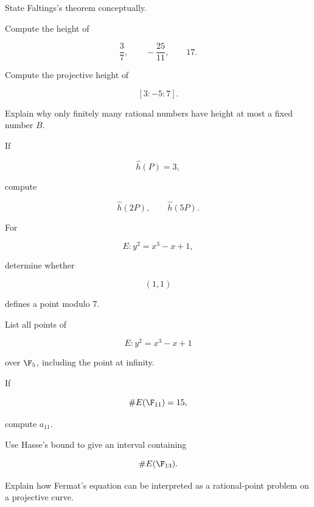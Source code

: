 \begin{exercise}[2]
State Faltings's theorem conceptually.
\end{exercise}

\begin{exercise}[1]
Compute the height of

\[
\frac37,\qquad
-\frac{25}{11},\qquad
17.
\]
\end{exercise}

\begin{exercise}[2]
Compute the projective height of

\[ [3:-5:7]. \]
\end{exercise}

\begin{exercise}[2]
Explain why only finitely many rational numbers have height at most a fixed
number \(B\).
\end{exercise}

\begin{exercise}[2]
If

\[ \hat h(P)=3, \]

compute

\[ \hat h(2P),\qquad\hat h(5P). \]
\end{exercise}

\begin{exercise}[2]
For

\[ E:y^2=x^3-x+1, \]

determine whether

\[ (1,1) \]

defines a point modulo \(7\).
\end{exercise}

\begin{exercise}[3]
List all points of

\[ E:y^2=x^3-x+1 \]

over \(\F_5\), including the point at infinity.
\end{exercise}

\begin{exercise}[2]
If

\[ \#E(\F_{11})=15, \]

compute \(a_{11}\).
\end{exercise}

\begin{exercise}[2]
Use Hasse's bound to give an interval containing

\[ \#E(\F_{13}). \]
\end{exercise}

\begin{exercise}[2]
Explain how Fermat's equation can be interpreted as a rational-point problem
on a projective curve.
\end{exercise}

